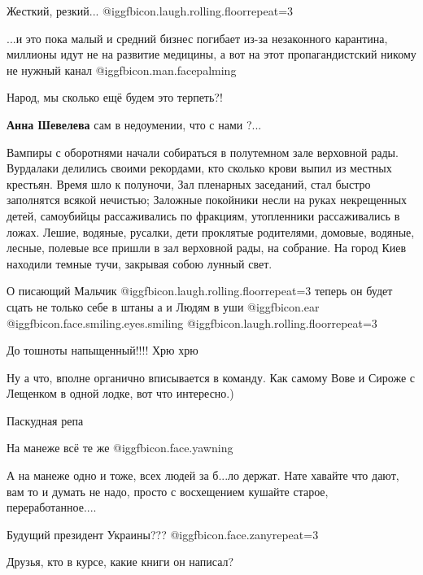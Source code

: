 \begin{itemize}
Жесткий, резкий... @igg{fbicon.laugh.rolling.floor}{repeat=3} 


...и это пока малый и средний бизнес погибает из-за незаконного карантина,
миллионы идут не на развитие медицины, а вот на этот пропагандистский никому не
нужный канал @igg{fbicon.man.facepalming} 

Народ, мы сколько ещё будем это терпеть?!

\textbf{Анна Шевелева} сам в недоумении, что с нами ?...


Вампиры с оборотнями начали собираться в полутемном зале верховной рады.
Вурдалаки делились своими рекордами, кто сколько крови выпил из местных
крестьян. Время шло к полуночи, Зал пленарных заседаний, стал быстро заполнятся
всякой нечистью; Заложные покойники несли на руках некрещенных детей,
самоубийцы рассаживались по фракциям, утопленники рассаживались в ложах. Лешие,
водяные, русалки, дети проклятые родителями, домовые, водяные, лесные, полевые
все пришли в зал верховной рады, на собрание. На город Киев находили темные
тучи, закрывая собою лунный свет.


О писающий Мальчик  @igg{fbicon.laugh.rolling.floor}{repeat=3}  теперь он будет
сцать не только себе в штаны а и Людям в уши  @igg{fbicon.ear} 
@igg{fbicon.face.smiling.eyes.smiling}
@igg{fbicon.laugh.rolling.floor}{repeat=3} 

До тошноты напыщенный!!!! Хрю хрю


Ну а что, вполне органично вписывается в команду. Как самому Вове и Сироже с
Лещенком в одной лодке, вот что интересно.)


Паскудная репа

На манеже всё те же  @igg{fbicon.face.yawning} 


А на манеже одно и тоже, всех людей за б...ло держат. Нате хавайте что дают,
вам то и думать не надо, просто с восхещением кушайте старое, переработанное....


Будущий президент Украины??? @igg{fbicon.face.zany}{repeat=3} 

Друзья, кто в курсе, какие книги он написал?


\end{itemize}

